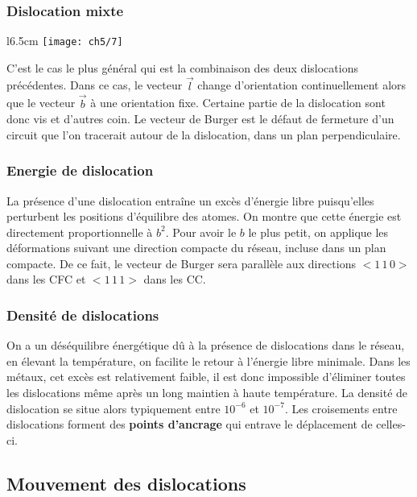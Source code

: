 	\subsubsection{Dislocation mixte}
	\begin{wrapfigure}[6]{l}{6.5cm}
	\vspace{-5mm}
	\texttt{[image: ch5/7]}
	\end{wrapfigure}
	C'est le cas le plus général qui est la combinaison des deux dislocations précédentes. Dans ce cas, le vecteur $\vec{l}$ change d'orientation continuellement alors que le vecteur $\vec{b}$ à une orientation fixe. Certaine partie de la dislocation sont donc vis et d'autres coin. 
	Le vecteur de Burger est le défaut de fermeture d'un circuit que l'on tracerait autour de la dislocation, dans un plan perpendiculaire. 
	
	\subsubsection{Energie de dislocation}
		La présence d'une dislocation entraîne un excès d'énergie libre puisqu'elles perturbent les positions d'équilibre des atomes. On montre que cette énergie est directement proportionnelle à $b^2$. Pour avoir le $b$ le plus petit, on applique les déformations suivant une direction compacte du réseau, incluse dans un plan compacte. De ce fait, le vecteur de Burger sera parallèle aux directions $<1\, 1\, 0>$ dans les CFC et $<1\, 1\, 1>$ dans les CC. 
		
	\subsubsection{Densité de dislocations}
		On a un déséquilibre énergétique dû à la présence de dislocations dans le réseau, en élevant la température, on facilite le retour à l'énergie libre minimale. Dans les métaux, cet excès est relativement faible, il est donc impossible d'éliminer toutes les dislocations même après un long maintien à haute température. La densité de dislocation se situe alors typiquement entre $10^{-6}$ et $10^{-7}$. Les croisements entre dislocations forment des \textbf{points d'ancrage} qui entrave le déplacement de celles-ci.
	
	\subsection{Mouvement des dislocations}

